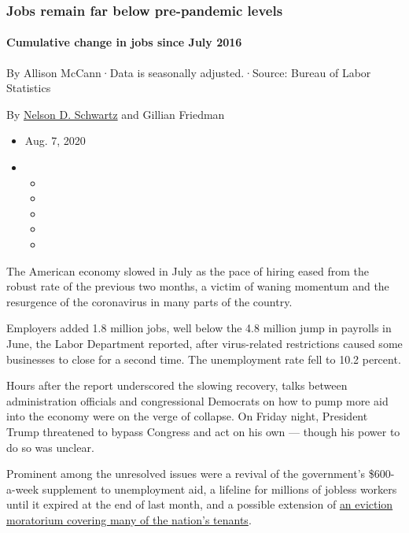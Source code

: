 \hypertarget{jobs-remain-far-below-pre-pandemic-levels}{%
\subsubsection{Jobs remain far below pre-pandemic
levels}\label{jobs-remain-far-below-pre-pandemic-levels}}

\hypertarget{cumulative-change-in-jobs-since-july-2016}{%
\paragraph{Cumulative change in jobs since July
2016}\label{cumulative-change-in-jobs-since-july-2016}}

By Allison McCann·Data is seasonally adjusted.·Source: Bureau of Labor
Statistics

By \href{https://www.nytimes3xbfgragh.onion/by/nelson-d-schwartz}{Nelson
D. Schwartz} and Gillian Friedman

\begin{itemize}
\item
  Aug. 7, 2020
\item
  \begin{itemize}
  \item
  \item
  \item
  \item
  \item
  \end{itemize}
\end{itemize}

The American economy slowed in July as the pace of hiring eased from the
robust rate of the previous two months, a victim of waning momentum and
the resurgence of the coronavirus in many parts of the country.

Employers added 1.8 million jobs, well below the 4.8 million jump in
payrolls in June, the Labor Department reported, after virus-related
restrictions caused some businesses to close for a second time. The
unemployment rate fell to 10.2 percent.

Hours after the report underscored the slowing recovery, talks between
administration officials and congressional Democrats on how to pump more
aid into the economy were on the verge of collapse. On Friday night,
President Trump threatened to bypass Congress and act on his own ---
though his power to do so was unclear.

Prominent among the unresolved issues were a revival of the government's
\$600-a-week supplement to unemployment aid, a lifeline for millions of
jobless workers until it expired at the end of last month, and a
possible extension of
\href{https://www.nytimes3xbfgragh.onion/2020/08/07/business/economy/housing-economy-eviction-renters.html}{an
eviction moratorium covering many of the nation's tenants}.

